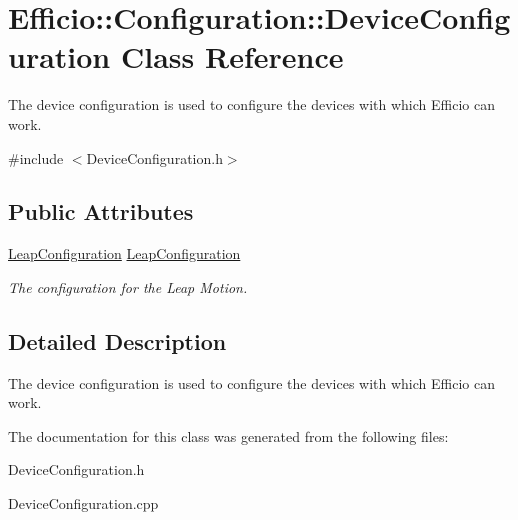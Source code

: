 \hypertarget{class_efficio_1_1_configuration_1_1_device_configuration}{}\section{Efficio\+:\+:Configuration\+:\+:Device\+Configuration Class Reference}
\label{class_efficio_1_1_configuration_1_1_device_configuration}


The device configuration is used to configure the devices with which Efficio can work.  




{\ttfamily \#include $<$Device\+Configuration.\+h$>$}

\subsection*{Public Attributes}
\begin{DoxyCompactItemize}
\item 
\hyperlink{class_efficio_1_1_configuration_1_1_leap_configuration}{Leap\+Configuration} \hyperlink{class_efficio_1_1_configuration_1_1_device_configuration_aa5c43ffa75c5483880a21ef3490b54d6}{Leap\+Configuration}\hypertarget{class_efficio_1_1_configuration_1_1_device_configuration_aa5c43ffa75c5483880a21ef3490b54d6}{}\label{class_efficio_1_1_configuration_1_1_device_configuration_aa5c43ffa75c5483880a21ef3490b54d6}

\begin{DoxyCompactList}\small\item\em The configuration for the Leap Motion. \end{DoxyCompactList}\end{DoxyCompactItemize}


\subsection{Detailed Description}
The device configuration is used to configure the devices with which Efficio can work. 

The documentation for this class was generated from the following files\+:\begin{DoxyCompactItemize}
\item 
Device\+Configuration.\+h\item 
Device\+Configuration.\+cpp\end{DoxyCompactItemize}
